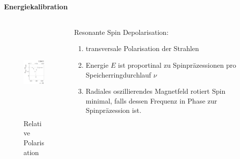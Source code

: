 \begin{iframe}
	\framesubtitle{Energiekalibration}
	\begin{columns}
		\begin{column}{0.48\textwidth}
	\begin{figure}
		\includegraphics[height=4.8cm]{img/resspin}
		\caption*{Relative Polarisation\cite{Arnaudon1995}}
	\end{figure}
\end{column}
		\begin{column}{0.48\textwidth}
			Resonante Spin Depolarisation:
			\begin{enumerate}
				\item transversale Polarisation der Strahlen
				\item Energie $E$ ist proportinal zu Spinpräzessionen pro Speicherringdurchlauf $\nu$
				\item Radiales oszillierendes Magnetfeld rotiert Spin minimal, falls dessen Frequenz in Phase zur Spinpräzession ist.
			\end{enumerate}
\end{column}
\end{columns}
\end{iframe}

